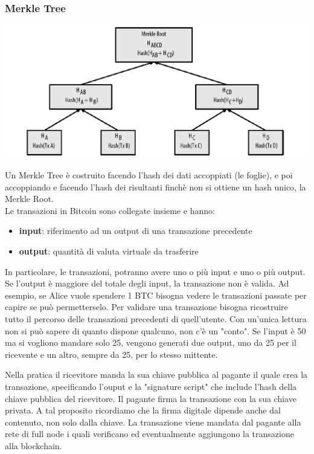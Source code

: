 \subsubsection{Merkle Tree}
\begin{center}
    \includegraphics[scale=0.4]{Images/Blockchain/MerkleTree.jpg}
\end{center}

Un Merkle Tree è costruito facendo l'hash dei dati accoppiati (le foglie), e poi accoppiando e facendo l'hash dei risultanti finchè non si ottiene un hash unico, la Merkle Root.\\

Le transazioni in Bitcoin sono collegate insieme e hanno:
\begin{itemize}
    \item \textbf{input}: riferimento ad un output di una transazione precedente
    \item \textbf{output}: quantità di valuta virtuale da trasferire
\end{itemize}
In particolare, le transazioni, potranno avere uno o più input e uno o più output. Se l'output è maggiore del totale degli input, la transazione non è valida. Ad esempio, se Alice vuole spendere 1 BTC bisogna vedere le transazioni passate per capire se può permetterselo. Per validare una transazione bisogna ricostruire tutto il percorso delle transazioni precedenti di quell'utente. Con un'unica lettura non si può sapere di quanto dispone qualcuno, non c'è un "conto". Se l'input è 50 ma si vogliono mandare solo 25, vengono generati due output, uno da 25 per il ricevente e un altro, sempre da 25, per lo stesso mittente.

Nella pratica il ricevitore manda la sua chiave pubblica al pagante il quale crea la transazione, specificando l'ouput e la "signature script" che include l'hash della chiave pubblica del ricevitore. Il pagante firma la transazione con la sua chiave privata. A tal proposito ricordiamo che la firma digitale dipende anche dal contenuto, non solo dalla chiave. La transazione viene mandata dal pagante alla rete di full node i quali verificano ed eventualmente aggiungono la transazione alla blockchain.


